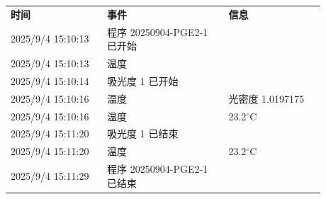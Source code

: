 \documentclass[UTF8,10pt,a4paper,fontset=fandol]{ctexart}
\newcommand{\fieldvalue}[1]{#1}
\begin{document}
\begin{center}
\small
\begin{tabular}{@{}p{0.27\linewidth}p{0.34\linewidth}p{0.27\linewidth}@{}}
\textbf{时间} & \textbf{事件} & \textbf{信息} \\[2pt]

\fieldvalue{2025/9/4 15:10:13} &
\fieldvalue{程序 20250904-PGE2-1 已开始} &
\\

\fieldvalue{2025/9/4 15:10:13} &
\fieldvalue{温度} &
\\

\fieldvalue{2025/9/4 15:10:14} &
\fieldvalue{吸光度 1 已开始} &
\\

\fieldvalue{2025/9/4 15:10:16} &
\fieldvalue{温度} &
\fieldvalue{光密度 1.0197175} \\

\fieldvalue{2025/9/4 15:10:16} &
\fieldvalue{温度} &
\fieldvalue{23.2$^\circ$C} \\

\fieldvalue{2025/9/4 15:11:20} &
\fieldvalue{吸光度 1 已结束} &
\\

\fieldvalue{2025/9/4 15:11:20} &
\fieldvalue{温度} &
\fieldvalue{23.2$^\circ$C} \\

\fieldvalue{2025/9/4 15:11:29} &
\fieldvalue{程序 20250904-PGE2-1 已结束} &
\\
\end{tabular}
\end{center}
\end{document}
